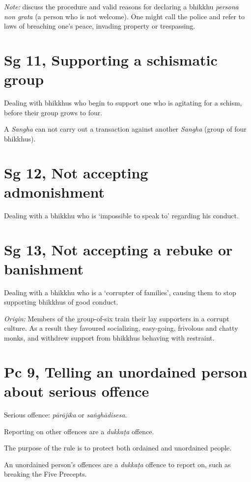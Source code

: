 \emph{Note:} discuss the procedure and valid reasons for declaring a
bhikkhu \emph{persona non grata} (a person who is not welcome). One
might call the police and refer to laws of breaching one's peace,
invading property or trespassing.

\section{Sg 11, Supporting a schismatic group}

Dealing with bhikkhus who begin to support one who is agitating for a
schism, before their group grows to four.

A \emph{Sangha} can not carry out a transaction against another
\emph{Sangha} (group of four bhikkhus).

\section{Sg 12, Not accepting admonishment}

Dealing with a bhikkhu who is `impossible to speak to' regarding his
conduct.

\section{Sg 13, Not accepting a rebuke or banishment}

Dealing with a bhikkhu who is a `corrupter of families', causing them to
stop supporting bhikkhus of good conduct.

\emph{Origin:} Members of the group-of-six train their lay supporters in
a corrupt culture. As a result they favoured socializing, easy-going,
frivolous and chatty monks, and withdrew support from bhikkhus behaving
with restraint.

\section{Pc 9, Telling an unordained person about serious offence}

Serious offence: \emph{pārājika} or \emph{saṅghādisesa}.

Reporting on other offences are a \emph{dukkaṭa} offence.

The purpose of the rule is to protect both ordained and unordained
people.

An unordained person's offences are a \emph{dukkaṭa} offence to report
on, such as breaking the Five Precepts.

